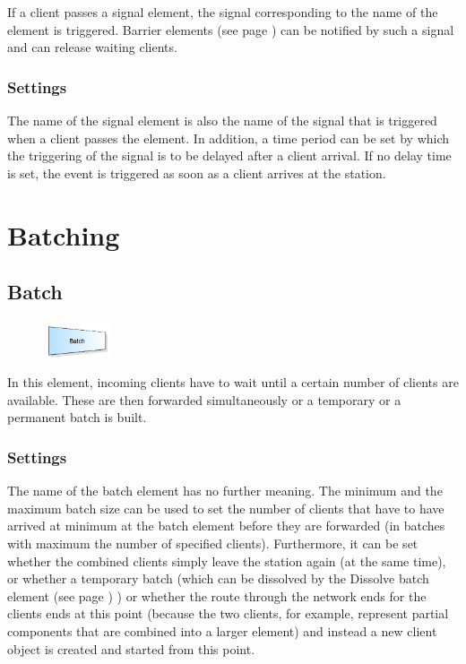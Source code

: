If a client passes a signal element, the signal corresponding to the name of the element is triggered.
Barrier elements (see page \pageref{ref:ModelElementBarrier}) can be notified by such a signal and can release waiting clients.

\subsection*{Settings}

The name of the signal element is also the name of the signal that is triggered when a client passes the element.
In addition, a time period can be set by which the triggering of the signal is to be delayed after a client arrival.
If no delay time is set, the event is triggered as soon as a client arrives at the station.





\chapter{Batching}

\section{Batch}
\label{ref:ModelElementBatch}

\begin{figure}
\vspace{-22pt}
\includegraphics[width=2cm]{imageModelElementBatch.png}
\vspace{-22pt}
\end{figure}

In this element, incoming clients have to wait until a certain number of clients are available.
These are then forwarded simultaneously or a temporary or a permanent batch is built.

\subsection*{Settings}

The name of the batch element has no further meaning. The minimum and the maximum batch size can be used
to set the number of clients that have to have arrived at minimum at the batch element before they are
forwarded (in batches with maximum the number of specified clients). Furthermore, it can be set whether
the combined clients simply leave the station again (at the same time), or whether a temporary batch (which
can be dissolved by the Dissolve batch element (see page \pageref{ref:ModelElementSeparate}) ) or whether the route
through the network ends for the clients ends at this point (because the two clients, for example, represent
partial components that are combined into a larger element) and instead a new client object is created and
started from this point.

